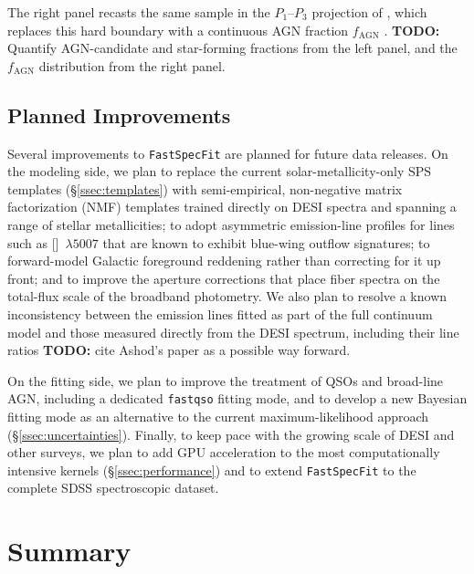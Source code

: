 \documentclass[modern,linenumbers]{aastex701}
\newcommand{\todo}[1]{{\color{red}\textbf{TODO:} #1}}
\newcommand{\fastspecfit}{\texttt{FastSpecFit}}
\begin{document}
The right panel recasts the same sample in the $P_1$--$P_3$ projection
of \citet{ji20a}, which replaces this hard boundary with a continuous
AGN fraction $f_\mathrm{AGN}$ \citep{jin21a}. \todo{Quantify
  AGN-candidate and star-forming fractions from the left panel, and
  the $f_\mathrm{AGN}$ distribution from the right panel.}

\subsection{Planned Improvements}
\label{ssec:improvements}

Several improvements to \fastspecfit{} are planned for future data
releases. On the modeling side, we plan to replace the current
solar-metallicity-only SPS templates (\S\ref{ssec:templates}) with
semi-empirical, non-negative matrix factorization (NMF) templates
trained directly on DESI spectra and spanning a range of stellar
metallicities; to adopt asymmetric emission-line profiles for lines
such as []~$\lambda5007$ that are known to exhibit
blue-wing outflow signatures; to forward-model Galactic foreground
reddening rather than correcting for it up front; and to improve the
aperture corrections that place fiber spectra on the total-flux scale
of the broadband photometry. We also plan to resolve a known
inconsistency between the emission lines fitted as part of the full
continuum model and those measured directly from the DESI spectrum,
including their line ratios \todo{cite Ashod's paper as a possible way
forward}.

On the fitting side, we plan to improve the treatment of QSOs and
broad-line AGN, including a dedicated \texttt{fastqso} fitting mode,
and to develop a new Bayesian fitting mode as an alternative to the
current maximum-likelihood approach (\S\ref{ssec:uncertainties}).
Finally, to keep pace with the growing scale of DESI and other
surveys, we plan to add GPU acceleration to the most computationally
intensive kernels (\S\ref{ssec:performance}) and to extend
\fastspecfit{} to the complete SDSS spectroscopic dataset.


\section{Summary}
\label{sec:summary}
\end{document}
